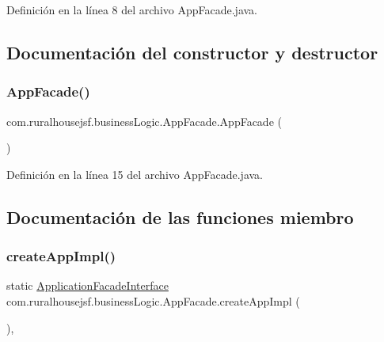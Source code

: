 Definición en la línea 8 del archivo App\+Facade.\+java.



\subsection{Documentación del constructor y destructor}
\mbox{\label{classcom_1_1ruralhousejsf_1_1business_logic_1_1_app_facade_a06c4cf71ecdbda8e7abccdd21d84d549}} 
\subsubsection{\texorpdfstring{AppFacade()}{AppFacade()}}
{\footnotesize\ttfamily com.\+ruralhousejsf.\+business\+Logic.\+App\+Facade.\+App\+Facade (\begin{DoxyParamCaption}{ }\end{DoxyParamCaption})\hspace{0.3cm}{\ttfamily [private]}}



Definición en la línea 15 del archivo App\+Facade.\+java.



\subsection{Documentación de las funciones miembro}
\mbox{\label{classcom_1_1ruralhousejsf_1_1business_logic_1_1_app_facade_a8f4d396c7d2ce6ba084554d68385fc34}} 
\subsubsection{\texorpdfstring{createAppImpl()}{createAppImpl()}}
{\footnotesize\ttfamily static \mbox{\hyperlink{interfacecom_1_1ruralhousejsf_1_1business_logic_1_1_application_facade_interface}{Application\+Facade\+Interface}} com.\+ruralhousejsf.\+business\+Logic.\+App\+Facade.\+create\+App\+Impl (\begin{DoxyParamCaption}{ }\end{DoxyParamCaption})\hspace{0.3cm}{\ttfamily [static]}, {\ttfamily [private]}}



